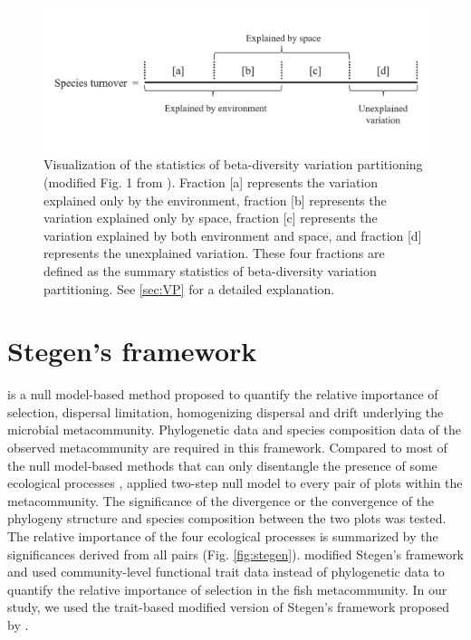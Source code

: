 \begin{figure}
	\centering
	\includegraphics[width=\linewidth]{./figures/ppt/VP.png}
	\caption[Visualization of the statistics of beta-diversity variation partitioning.]{\small
		Visualization of the statistics of beta-diversity variation partitioning (modified Fig. 1 from \citealp{peres2006variation}). Fraction [a] represents the variation explained only by the environment, fraction [b] represents the variation explained only by space, fraction [c] represents the variation explained by both environment and space, and fraction [d] represents the unexplained variation. These four fractions are defined as the summary statistics of beta-diversity variation partitioning. See \autoref{sec:VP} for a detailed explanation.}
	\label{fig:VP}
\end{figure}

\section{Stegen's framework}
\noindent
\label{sec:Stegen}
\citet{stegen2013quantifying} is a null model-based method proposed to quantify the relative importance of selection, dispersal limitation, homogenizing dispersal and drift underlying the microbial metacommunity. Phylogenetic data and species composition data of the observed metacommunity are required in this framework. Compared to most of the null model-based methods that can only disentangle the presence of some ecological processes \citep{ulrich2010null, chase2011disentangling}, \citet{stegen2013quantifying} applied two-step null model to every pair of plots within the metacommunity. The significance of the divergence or the convergence of the phylogeny structure and species composition between the two plots was tested. The relative importance of the four ecological processes is summarized by the significances derived from all pairs (Fig. \ref{fig:stegen}). \citet{ford2020functional} modified Stegen's framework and used community-level functional trait data instead of phylogenetic data to quantify the relative importance of selection in the fish metacommunity. In our study, we used the trait-based modified version of Stegen's framework proposed by \citet{ford2020functional}.

